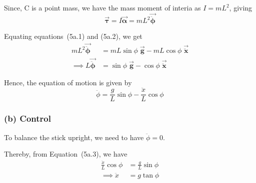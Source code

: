Since, C is a point mass, we have the mass moment of interia as \( I = mL^2 \), giving
\begin{equation}
    \vec{\boldsymbol{\tau}} = I \vec{\boldsymbol{\alpha}} = mL^2 \vec{\ddot{\boldsymbol{\phi}}}
    \tag{5a.2}
\end{equation}

Equating equations~(5a.1) and (5a.2), we get
\begin{align*}
    mL^2 \vec{\ddot{\boldsymbol{\phi}}}
     & =
    mL\sin\phi \; \vec{\mathbf{g}} - mL\cos\phi \; \vec{\ddot{\mathbf{x}}} \\
    \implies
    L \vec{\ddot{\boldsymbol{\phi}}}
     & =
    \sin\phi \; \vec{\mathbf{g}} - \cos\phi \; \vec{\ddot{\mathbf{x}}}
\end{align*}

Hence, the equation of motion is given by
\begin{equation}
    \boxed{
        \ddot{\phi} = \frac{g}{L} \sin\phi - \frac{\ddot x}{L} \cos\phi
    }
    \tag{5a.3}
\end{equation}

\subsubsection*{(b) Control}

To balance the stick upright, we need to have \( \ddot\phi = 0 \).

Thereby, from Equation~(5a.3), we have
\begin{align*}
    \frac{\ddot x}{L} \cos\phi
     & =
    \frac{g}{L} \sin\phi
    \\ \implies
    \ddot x
     & =
    g \tan\phi
\end{align*}
